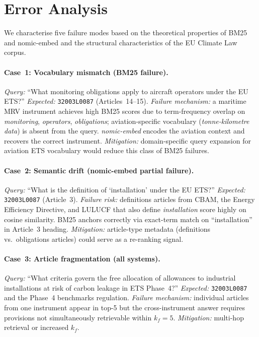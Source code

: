 \documentclass[sigconf,screen]{acmart}
\newcommand{\nomicshort}{nomic-embed\xspace}
\begin{document}
\section{Error Analysis}
\label{sec:error}

We characterise five failure modes based on the theoretical
properties of BM25 and \nomicshort and the structural
characteristics of the EU Climate Law corpus.

\paragraph{Case~1: Vocabulary mismatch (BM25 failure).}
\textit{Query:} ``What monitoring obligations apply to aircraft
operators under the EU ETS?''
\textit{Expected:} \texttt{32003L0087} (Articles~14--15).
\textit{Failure mechanism:} a maritime MRV instrument achieves high
BM25 scores due to term-frequency overlap on \textit{monitoring},
\textit{operators}, \textit{obligations}; aviation-specific
vocabulary (\textit{tonne-kilometre data}) is absent from the query.
\textit{\nomicshort} encodes the aviation context and recovers the
correct instrument.
\textit{Mitigation:} domain-specific query expansion for aviation
ETS vocabulary would reduce this class of BM25 failures.

\paragraph{Case~2: Semantic drift (\nomicshort partial failure).}
\textit{Query:} ``What is the definition of `installation' under the
EU ETS?''
\textit{Expected:} \texttt{32003L0087} (Article~3).
\textit{Failure risk:} definitions articles from CBAM, the Energy
Efficiency Directive, and LULUCF that also define
\textit{installation} score highly on cosine similarity.  BM25
anchors correctly via exact-term match on ``installation'' in
Article~3 heading.
\textit{Mitigation:} article-type metadata (definitions vs.\
obligations articles) could serve as a re-ranking signal.

\paragraph{Case~3: Article fragmentation (all systems).}
\textit{Query:} ``What criteria govern the free allocation of
allowances to industrial installations at risk of carbon leakage
in ETS Phase~4?''
\textit{Expected:} \texttt{32003L0087} and the Phase~4 benchmarks
regulation.
\textit{Failure mechanism:} individual articles from one instrument
appear in top-5 but the cross-instrument answer requires provisions
not simultaneously retrievable within $k_f{=}5$.
\textit{Mitigation:} multi-hop retrieval or increased $k_f$.
\end{document}
